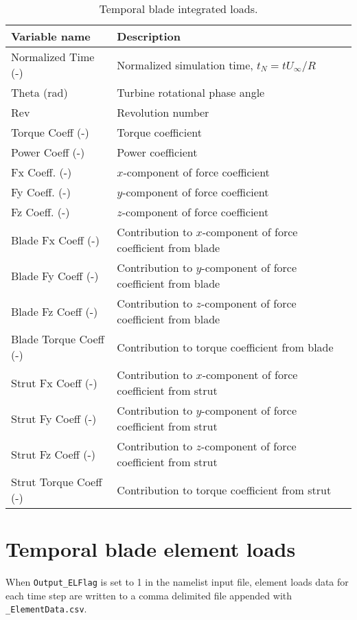\begin{table}[!htbp]
\centering
\caption{Temporal blade integrated loads.}
\label{tbl:output_vars_time}
\begin{tabular}{p{}p{}}
\toprule
Variable name & Description \\ \midrule
Normalized Time (-)                   & Normalized simulation time, $t_N=t U_\infty/R$ \\
Theta (rad)                           & Turbine rotational phase angle \\
Rev                                   & Revolution number \\
Torque Coeff (-)                      & Torque coefficient \\
Power Coeff (-)                       & Power coefficient \\
Fx Coeff. (-)                         & $x$-component of force coefficient \\
Fy Coeff. (-)                         & $y$-component of force coefficient \\
Fz Coeff. (-)                         & $z$-component of force coefficient \\
Blade Fx Coeff (-)                    & Contribution to $x$-component of force coefficient from blade \\
Blade Fy Coeff (-)                    & Contribution to $y$-component of force coefficient from blade \\
Blade Fz Coeff (-)                    & Contribution to $z$-component of force coefficient from blade \\
Blade Torque Coeff (-)                & Contribution to torque coefficient from blade \\
Strut Fx Coeff (-)                    & Contribution to $x$-component of force coefficient from strut \\
Strut Fy Coeff (-)                    & Contribution to $y$-component of force coefficient from strut \\
Strut Fz Coeff (-)                    & Contribution to $z$-component of force coefficient from strut \\
Strut Torque Coeff (-)                & Contribution to torque coefficient from strut \\
\bottomrule
\end{tabular}
\end{table}

\section{Temporal blade element loads}
When \texttt{Output\_ELFlag} is set to 1 in the namelist input file, element loads data for each time step are written to a comma delimited file appended with \texttt{\_ElementData.csv}.


